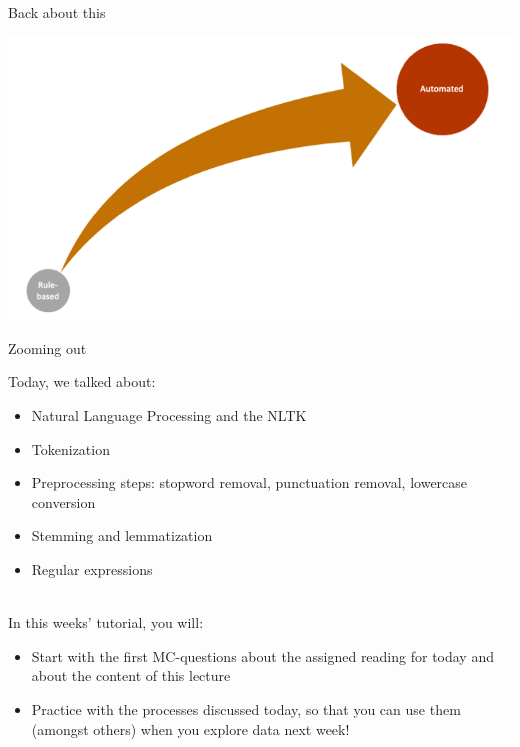 \documentclass[handout]{beamer}
\begin{document}
\begin{frame}{Back about this}
	
	\begin{center}
		\includegraphics[width=\linewidth,height=\textheight,keepaspectratio]{../pictures/Roadmap.png} 
	\end{center}
	
\end{frame}





\begin{frame}{Zooming out} 
	
Today, we talked about:
\begin{itemize}
	\item Natural Language Processing and the NLTK
	\item Tokenization
	\item Preprocessing steps: stopword removal, punctuation removal, lowercase conversion
	\item Stemming and lemmatization
	\item Regular expressions \\\
\end{itemize}

\end{frame}


\begin{frame}
	
In this weeks' tutorial, you will:
\begin{itemize}
	\item Start with the first MC-questions about the assigned reading for today and about the content of this lecture
	\item Practice with the processes discussed today, so that you can use them (amongst others) when you explore data next week!
\end{itemize}
	
\end{frame}
\end{document}

